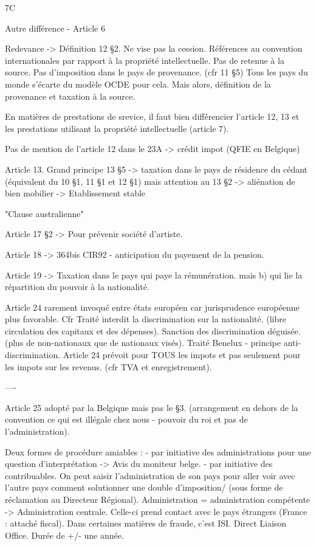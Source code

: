 \documentclass{book}
\begin{document}
7C

Autre différence - Article 6

Redevance -> Définition 12 §2. Ne vise pas la cession. Références au convention internationales par rapport à la propriété intellectuelle. Pas de retenue à la source. Pas d'imposition dans le pays de provenance. (cfr 11 §5) Tous les pays du monde s'écarte du modèle OCDE pour cela. Mais alors, définition de la provenance et taxation à la source.

En matières de prestations de srevice, il faut bien différencier l'article 12, 13 et les prestations utilisant la propriété intellectuelle (article 7).

Pas de mention de l'article 12 dans le 23A -> crédit impot (QFIE en Belgique)


Article 13. Grand principe 13 §5 -> taxation dans le pays de résidence du cédant (équivalent du 10 §1, 11 §1 et 12 §1) mais attention au 13 §2 -> aliénation de bien mobilier -> Etablissement stable


"Clause australienne"

Article 17 §2 -> Pour prévenir société d'artiste.

Article 18 -> 364bis CIR92 - anticipation du payement de la pension.

Article 19 -> Taxation dans le pays qui paye la rémunération. mais b) qui lie la répartition du pouvoir à la nationalité.

Article 24 rarement invoqué entre états européen car jurisprudence européenne plus favorable. Cfr Traité interdit la discrimination sur la nationalité. (libre circulation des capitaux et des dépenses). Sanction des discrimination déguisée. (plus de non-nationaux que de nationaux visés). Traité Benelux - principe anti-discrimination. Article 24 prévoit pour TOUS les impots et pas seulement pour les impots sur les revenus. (cfr TVA et enregistrement).

----

Article 25 adopté par la Belgique mais pas le §3. (arrangement en dehors de la convention ce qui est illégale chez nous - pouvoir du roi et pas de l'administration).

Deux formes de procédure amiables :
- par initiative des administrations pour une question d'interprétation -> Avis du moniteur belge.
- par initiative des contribuables. On peut saisir l'administration de son pays pour aller voir avec l'autre pays comment solutionner une double d'imposition/ (sous forme de réclamation au Directeur Régional). Administration = administration compétente -> Administration centrale. Celle-ci prend contact avec le pays étrangers (France : attaché fiscal). Dans certaines matières de fraude, c'est ISI. Direct Liaison Office. 
Durée de +/- une année.
\end{document}
